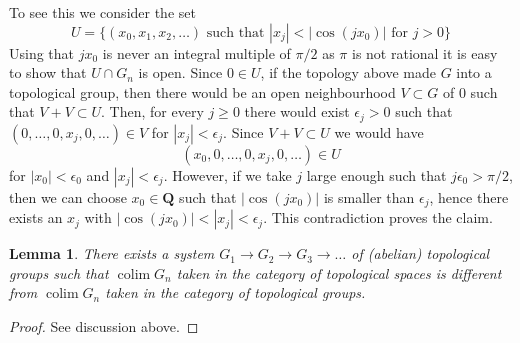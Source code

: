\documentclass[10pt,a4paper]{amsart}
\theoremstyle{plain}
\newtheorem{lemma}[subsection]{Lemma}
\theoremstyle{definition}
\theoremstyle{remark}
\numberwithin{equation}{subsection}
\def\colim{\mathop{\mathrm{colim}}\nolimits}
\begin{document}
\medskip\noindent
To see this we consider the set
$$
U = \{(x_0, x_1, x_2, \ldots)\text{ such that }
|x_j| < |\cos(jx_0)| \text{ for } j > 0\}
$$
Using that $jx_0$ is never an integral multiple of $\pi/2$ as $\pi$
is not rational it is easy to show that $U \cap G_n$ is open. Since
$0 \in U$, if the topology above made $G$ into a topological group,
then there would be an open neighbourhood $V \subset G$ of $0$
such that $V + V \subset U$. Then, for every $j \geq 0$ there would
exist $\epsilon_j > 0$ such that $(0, \ldots, 0, x_j, 0, \ldots) \in V$
for $|x_j| < \epsilon_j$. Since $V + V \subset U$ we would have
$$
(x_0, 0, \ldots, 0, x_j, 0, \ldots) \in U
$$
for $|x_0| < \epsilon_0$ and $|x_j| < \epsilon_j$. However, if we
take $j$ large enough such that $j \epsilon_0 > \pi/2$, then we can
choose $x_0 \in \mathbf{Q}$ such that $|\cos(jx_0)|$ is smaller than
$\epsilon_j$, hence there exists an $x_j$ with
$|\cos(jx_0)| < |x_j| < \epsilon_j$. This contradiction proves the claim.

\begin{lemma}
\label{lemma-colimit-topology}
There exists a system $G_1 \to G_2 \to G_3 \to \ldots$ of (abelian)
topological groups such that $\colim G_n$ taken in the category of
topological spaces is different from $\colim G_n$ taken in the category
of topological groups.
\end{lemma}

\begin{proof}
See discussion above.
\end{proof}
\end{document}
